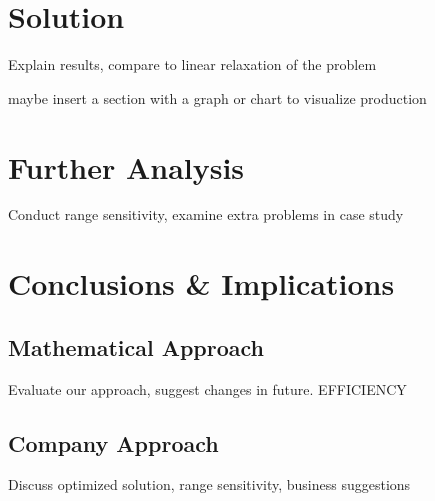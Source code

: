 \documentclass{article}
\begin{document}
\section{Solution}
Explain results, compare to linear relaxation of the problem
\par
maybe insert a section with a graph or chart to visualize production
\section{Further Analysis}
Conduct range sensitivity, examine extra problems in case study
\section{Conclusions \& Implications}
\subsection{Mathematical Approach}
Evaluate our approach, suggest changes in future.  EFFICIENCY
\subsection{Company Approach}
Discuss optimized solution, range sensitivity, business suggestions
	\newpage
	\begin{thebibliography}{9}

\end{thebibliography}
\end{document}

